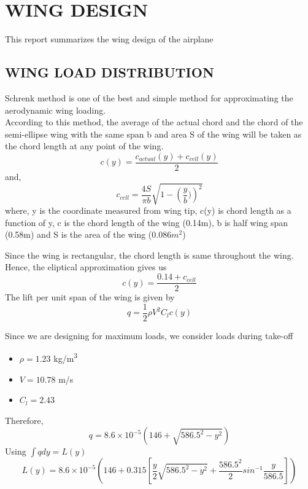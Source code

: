 \chapter{WING DESIGN}
\label{ch2}
This report summarizes the wing design of the airplane

\section{WING LOAD DISTRIBUTION}
\label{s:ch2_wingdesign}
Schrenk method is one of the best and simple method for approximating the aerodynamic wing 
loading.
\\
According to this method, the average of the actual chord and the chord of the semi-ellipse wing 
with the same span b and area S of the wing will be taken as the chord length at any point of the 
wing.
\begin{equation} c(y) = \frac{c_{actual}(y) + c_{cell}(y)}{2} \end{equation}
and,  \[ c_{cell} = \frac{4S}{\pi b}\sqrt{1 - \left(\frac{y}{b})\right)^2} \]
where, y is the coordinate measured from wing tip, c(y) is chord length as a function of y, c is the chord length of the wing (0.14m), b is half wing span (0.58m) and S is the area of the wing (0.086$m^2$)

Since the wing is rectangular, the chord length is same throughout the wing. Hence, the eliptical approximation gives us
\begin{equation} c(y) = \frac{0.14 + c_{cell}}{2} \end{equation}
The lift per unit span of the wing is given by
\begin{equation} q = \frac{1}{2}\rho V^2C_lc(y) \end{equation}

\pagebreak
Since we are designing for maximum loads, we consider loads during take-off
\begin{itemize}
\item $\rho = 1.23$ kg/m\textsuperscript{3}
\item $V = 10.78$  m/s
\item $C_l = 2.43$
\end{itemize}
Therefore,
\begin{equation} q = 8.6\times10^{-5}(146 + \sqrt{586.5^2 - y^2}) \end{equation}
Using $\int{qdy} = L(y)$
\begin{equation}
L(y) = 8.6\times10^{-5}\left(146 + 0.315\left[\frac{y}{2}\sqrt{586.5^2 - y^2} + \frac{586.5^2}{2}sin^{-1}\frac{y}{586.5}\right]\right)
\end{equation}

